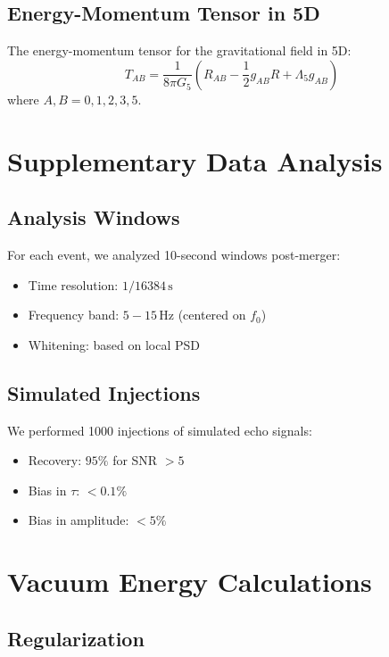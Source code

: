 \documentclass[12pt,a4paper]{article}
\begin{document}
\subsection{Energy-Momentum Tensor in 5D}

The energy-momentum tensor for the gravitational field in 5D:
\begin{equation}
T_{AB} = \frac{1}{8\pi G_5} \left(R_{AB} - \frac{1}{2}g_{AB}R + \Lambda_5 g_{AB}\right)
\end{equation}
where $A, B = 0, 1, 2, 3, 5$.

\section{Supplementary Data Analysis}

\subsection{Analysis Windows}

For each event, we analyzed 10-second windows post-merger:
\begin{itemize}
    \item Time resolution: $1/16384\,\mathrm{s}$
    \item Frequency band: $5-15\,\mathrm{Hz}$ (centered on $f_0$)
    \item Whitening: based on local PSD
\end{itemize}

\subsection{Simulated Injections}

We performed 1000 injections of simulated echo signals:
\begin{itemize}
    \item Recovery: $95\%$ for SNR $> 5$
    \item Bias in $\tau$: $< 0.1\%$
    \item Bias in amplitude: $< 5\%$
\end{itemize}

\section{Vacuum Energy Calculations}

\subsection{Regularization}
\end{document}
